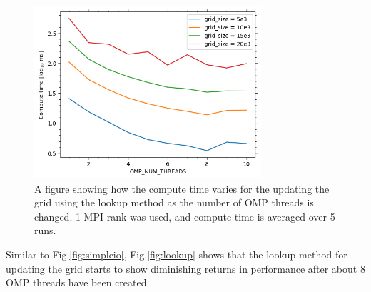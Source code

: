     \begin{figure}[htb]
    \centering
    \includegraphics[width=0.75\textwidth]{./figures/lookup}
    \caption{A figure showing how the compute time varies for the updating the grid using the lookup method as the number
        of OMP threads is changed.
        1 MPI rank was used, and compute time is averaged over 5 runs.}
    \label{fig:lookup}
    \end{figure}

    Similar to Fig.\eqref{fig:simpleio}, Fig.\eqref{fig:lookup} shows that the lookup method for updating the grid starts
    to show diminishing returns in performance after about 8 OMP threads have been created.

